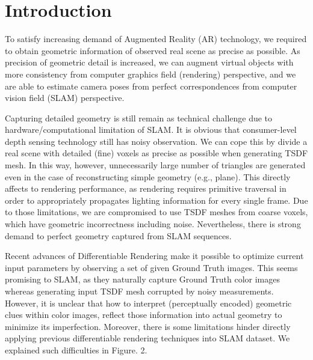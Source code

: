 \section{Introduction}

To satisfy increasing demand of 
Augmented Reality (AR) technology, 
we required to obtain geometric information of observed real scene 
as precise as possible. 
As precision of geometric detail is increased, 
we can augment virtual objects with more consistency from computer graphics field (rendering) perspective, 
and we are able to estimate camera poses from perfect correspondences from computer vision field (SLAM) perspective.

Capturing detailed geometry is still remain as technical challenge 
due to hardware/computational limitation of SLAM. 
It is obvious that consumer-level depth sensing technology 
still has noisy observation. We can cope this 
by divide a real scene with detailed (fine) voxels 
as precise as possible when generating TSDF mesh. 
In this way, however, unnecessarily large number of triangles 
are generated even in the case of reconstructing simple geometry (e.g., plane). 
This directly affects to rendering performance, 
as rendering requires primitive traversal in order to 
appropriately propagates lighting information for every single frame. 
Due to those limitations, we are compromised to 
use TSDF meshes from coarse voxels, which have geometric incorrectness including noise. 
Nevertheless, there is strong demand to perfect geometry captured from SLAM sequences. 

Recent advances of Differentiable Rendering make it possible to 
optimize current input parameters by observing a set of given Ground Truth images. 
This seems promising to SLAM, as they naturally capture 
Ground Truth color images whereas generating 
input TSDF mesh corrupted by noisy measurements. 
However, it is unclear that how to interpret (perceptually encoded) geometric clues within color images, 
reflect those information into actual geometry to minimize its imperfection. 
Moreover, there is some limitations hinder directly applying 
previous differentiable rendering techniques into SLAM dataset. 
We explained such difficulties in Figure. 2.

